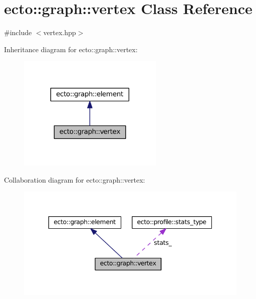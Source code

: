 \hypertarget{classecto_1_1graph_1_1vertex}{}\section{ecto\+:\+:graph\+:\+:vertex Class Reference}
\label{classecto_1_1graph_1_1vertex}


{\ttfamily \#include $<$vertex.\+hpp$>$}



Inheritance diagram for ecto\+:\+:graph\+:\+:vertex\+:\nopagebreak
\begin{figure}[H]
\begin{center}
\leavevmode
\includegraphics[width=197pt]{classecto_1_1graph_1_1vertex__inherit__graph}
\end{center}
\end{figure}


Collaboration diagram for ecto\+:\+:graph\+:\+:vertex\+:\nopagebreak
\begin{figure}[H]
\begin{center}
\leavevmode
\includegraphics[width=344pt]{classecto_1_1graph_1_1vertex__coll__graph}
\end{center}
\end{figure}
